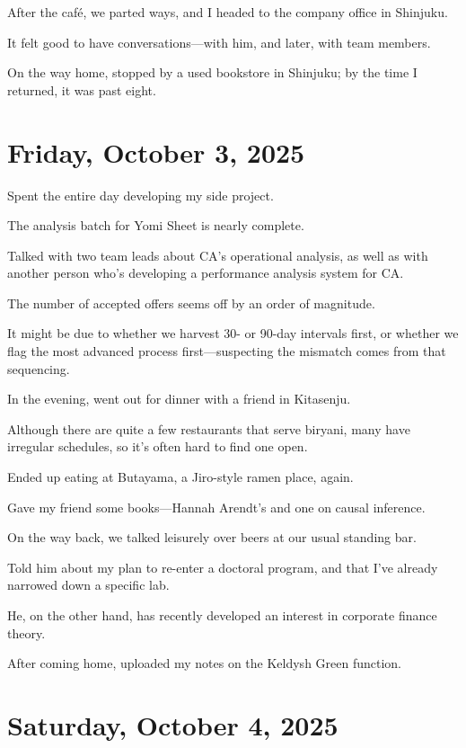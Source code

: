 \documentclass[uplatex]{jsarticle}
\begin{document}
After the café, we parted ways, and I headed to the company office in Shinjuku.

It felt good to have conversations—with him, and later, with team members.

On the way home, stopped by a used bookstore in Shinjuku; by the time I returned, it was past eight.



\section{Friday, October 3, 2025}

Spent the entire day developing my side project.

The analysis batch for Yomi Sheet is nearly complete.

Talked with two team leads about CA's operational analysis, as well as with another person who's developing a performance analysis system for CA.

The number of accepted offers seems off by an order of magnitude.

It might be due to whether we harvest 30- or 90-day intervals first, or whether we flag the most advanced process first—suspecting the mismatch comes from that sequencing.

In the evening, went out for dinner with a friend in Kitasenju.

Although there are quite a few restaurants that serve biryani, many have irregular schedules, so it's often hard to find one open.

Ended up eating at Butayama, a Jiro-style ramen place, again.

Gave my friend some books—Hannah Arendt's and one on causal inference.

On the way back, we talked leisurely over beers at our usual standing bar.

Told him about my plan to re-enter a doctoral program, and that I've already narrowed down a specific lab.

He, on the other hand, has recently developed an interest in corporate finance theory.

After coming home, uploaded my notes on the Keldysh Green function.



\section{Saturday, October 4, 2025}
\end{document}
